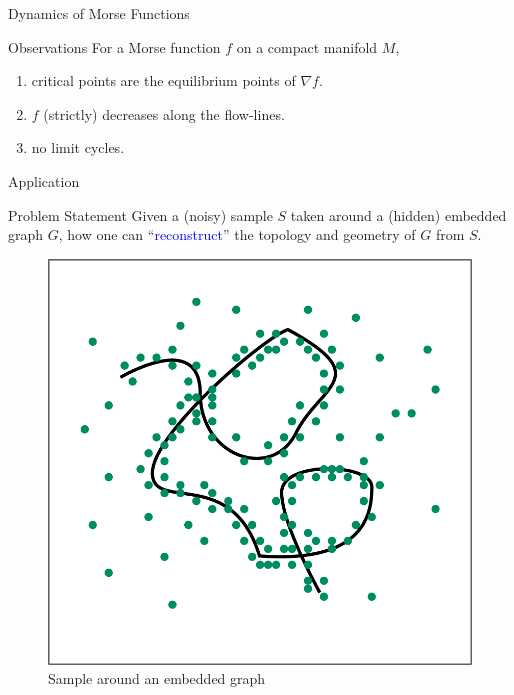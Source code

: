 \documentclass[9pt,sans-serif]{beamer}
\begin{document}
\begin{frame}{Dynamics of Morse Functions}
  \begin{block}{Observations}
    For a Morse function $f$ on a compact manifold $M$,
    \begin{enumerate}
    \item critical points are the equilibrium points of $\nabla f$.
      \pause
    \item $f$ (strictly) decreases along the flow-lines. 
      \pause
    \item no limit cycles.
    \end{enumerate}
  \end{block}
\end{frame}

\begin{frame}{Application}
  \begin{block}{Problem Statement}
    Given a (noisy) sample $S$ taken around a (hidden) embedded graph $G$, how
    one can ``\textcolor{blue}{reconstruct}'' the topology and geometry of $G$
    from $S$.
  \end{block}
  
  \begin{figure}[htb]
    \centering \includegraphics[scale=0.3]{sample}
    \caption{Sample around an embedded graph}
  \end{figure}
\end{frame}
\end{document}
